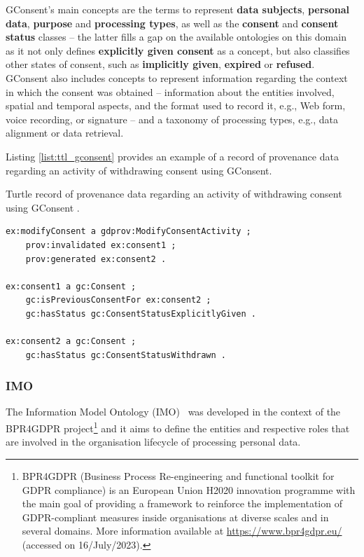 GConsent's main concepts are the terms to represent \textbf{data subjects}, \textbf{personal data}, \textbf{purpose} and \textbf{processing types}, as well as the \textbf{consent} and \textbf{consent status} classes -- the latter fills a gap on the available ontologies on this domain as it not only defines \textbf{explicitly given consent} as a concept, but also classifies other states of consent, such as \textbf{implicitly given}, \textbf{expired} or \textbf{refused}.
GConsent also includes concepts to represent information regarding the context in which the consent was obtained -- information about the entities involved, spatial and temporal aspects, and the format used to record it, e.g., Web form, voice recording, or signature -- and a taxonomy of processing types, e.g., data alignment or data retrieval.

Listing \ref{list:ttl_gconsent} provides an example of a record of provenance data regarding an activity of withdrawing consent using GConsent.

\begin{listing}[ht]
\caption{Turtle record of provenance data regarding an activity of withdrawing consent using GConsent \citep{hitzler_gconsent_2019}.}
\label{list:ttl_gconsent}
\begin{verbatim}
ex:modifyConsent a gdprov:ModifyConsentActivity ;
    prov:invalidated ex:consent1 ;
    prov:generated ex:consent2 .

ex:consent1 a gc:Consent ;
    gc:isPreviousConsentFor ex:consent2 ;
    gc:hasStatus gc:ConsentStatusExplicitlyGiven .

ex:consent2 a gc:Consent ;
    gc:hasStatus gc:ConsentStatusWithdrawn .
\end{verbatim}
\end{listing}

\subsubsection{IMO}
\label{sec:imo}

The Information Model Ontology (IMO)~\citep{papagiannakopoulou_leveraging_2014,lioudakis_compliance_2019} was developed in the context of the BPR4GDPR project\footnote{BPR4GDPR (Business Process Re-engineering and functional toolkit for GDPR compliance) is an European Union H2020 innovation programme with the main goal of providing a framework to reinforce the implementation of GDPR-compliant measures inside organisations at diverse scales and in several domains. More information available at \url{https://www.bpr4gdpr.eu/} (accessed on 16/July/2023).} and it aims to define the entities and respective roles that are involved in the organisation lifecycle of processing personal data.


